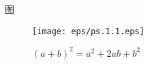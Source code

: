 \documentclass[main.tex]{subfiles}
\begin{document}
图

\begin{figure}[h]
	\centering
	\texttt{[image: eps/ps.1.1.eps]}
	\caption{$(a+b)^2 = a^2 + 2ab + b^2$}
	\label{fig:chap1.4.1}
\end{figure}	
\end{document}
